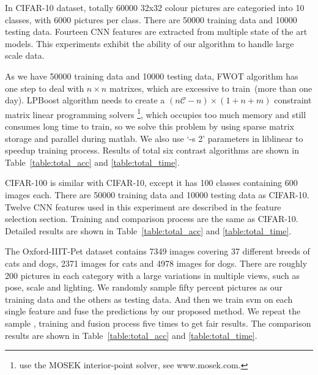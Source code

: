 \documentclass[letterpaper]{article}
\def\calC{{\mathcal{C}}}
\begin{document}

In CIFAR-10 dataset, totally 60000 32x32 colour pictures are categoried into 10 classes, with 6000 pictures per class.
There are 50000 training data and 10000 testing data.
Fourteen CNN features are extracted from multiple state of the art models.
This experiments exhibit the ability of our algorithm to handle large scale data.

As we have 50000 training data and 10000 testing data,
FWOT algorithm has one step to deal with $n\times n$ matrixes, which are excessive to train~(more than one day).
LPBoost algorithm needs to create a $(n\calC - n) \times (1 + n + m)$ constraint matrix linear programming solvers
\footnote{\cite{gehler2009feature} use the MOSEK interior-point solver, see www.mosek.com.},
which occupies too much memory and still consumes long time to train, so we solve this problem by using sparse matrix storage and parallel during matlab.
We also use `-s 2' parameters in liblinear to speedup training process.
Results of total six contrast algorithms are shown in Table~\ref{table:total_acc} and \ref{table:total_time}.



CIFAR-100 is similar with CIFAR-10, except it has 100 classes containing 600 images each.
There are 50000 training data and 10000 testing data as CIFAR-10.
Twelve CNN features used in this experiment are described in the feature selection section.
Training and comparison process are the same as CIFAR-10.
Detailed results are shown in Table~\ref{table:total_acc} and \ref{table:total_time}.



The Oxford-IIIT-Pet dataset contains 7349 images covering 37 different breeds of cats and dogs, 2371 images for cats and 4978 images for dogs.
There are roughly 200 pictures in each category with a large variations in multiple views, such as pose, scale and lighting.
We randomly sample fifty percent pictures as our training data and the others as testing data.
And then we train svm on each single feature and fuse the predictions by our proposed method.
We repeat the sample , training and fusion process five times to get fair results.
The comparison results are shown in Table~\ref{table:total_acc} and \ref{table:total_time}.
\end{document}
